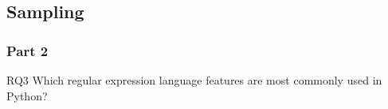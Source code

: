 
\subsection{Sampling}

\begin{frame}
\frametitle{Part 2}

\begin{block}{RQ3}
Which regular expression language features are most commonly used in Python?
\end{block}
\end{frame}


